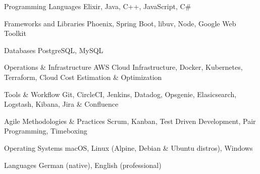 

\begin{cvskills}

  \cvskill
    {Programming Languages} %
    {Elixir, Java, C++, JavaScript, C\#} %
  
  \cvskill
    {Frameworks and Libraries} %
    {Phoenix, Spring Boot, libuv, Node, Google Web Toolkit} %
  
  \cvskill
    {Databases} %
    {PostgreSQL, MySQL} %

  \cvskill
    {Operations \& Infrastructure} %
    {AWS Cloud Infrastructure, Docker, Kubernetes, Terraform, Cloud Cost Estimation \& Optimization} %

  \cvskill
    {Tools \& Workflow} %
    {Git, CircleCI, Jenkins, Datadog, Opsgenie, Elasicsearch, Logstash, Kibana, Jira \& Confluence} %

  \cvskill
    {Agile Methodologies \& Practices} %
    {Scrum, Kanban, Test Driven Development, Pair Programming, Timeboxing} %

  \cvskill
    {Operating Systems} %
    {macOS, Linux (Alpine, Debian \& Ubuntu distros), Windows} %

  \cvskill
    {Languages} %
    {German (native), English (professional)} %

\end{cvskills}
